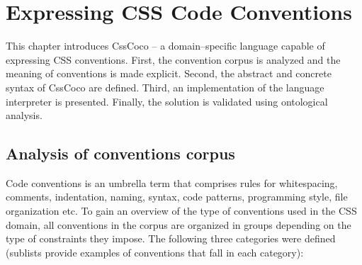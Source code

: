 \chapter{Expressing CSS Code Conventions}
\label{sec:expressing}

This chapter introduces CssCoco -- a domain--specific language capable of expressing CSS conventions. First, the convention corpus is analyzed and the meaning of conventions is made explicit. Second, the abstract and concrete syntax of CssCoco are defined. Third, an implementation of the language interpreter is presented. Finally, the solution is validated using ontological analysis.

\section{Analysis of conventions corpus}

Code conventions is an umbrella term that comprises rules for whitespacing, comments, indentation,
naming, syntax, code patterns, programming style, file organization etc. To gain an overview of the
type of conventions used in the CSS domain, all conventions in the corpus are organized in groups
depending on the type of constraints they impose. The following three categories were defined
(sublists provide examples of conventions that fall in each category):

